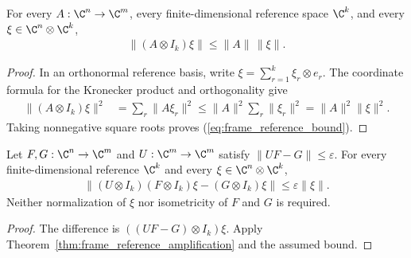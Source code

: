 \begin{theorem}
    \label{thm:frame_reference_amplification}
    \leanok
    For every $A:\C^n\to\C^m$, every finite-dimensional reference space
    $\C^k$, and every $\xi\in\C^n\otimes\C^k$,
    \begin{align}
        \|(A\otimes I_k)\xi\|\le\|A\|\,\|\xi\|.
        \label{eq:frame_reference_bound}
    \end{align}
\end{theorem}
\begin{proof}\leanok
    In an orthonormal reference basis, write
    $\xi=\sum_{r=1}^k\xi_r\otimes e_r$. The coordinate formula for the
    Kronecker product and orthogonality give
    \begin{align}
        \|(A\otimes I_k)\xi\|^2
         & =\sum_r\|A\xi_r\|^2
        \le\|A\|^2\sum_r\|\xi_r\|^2
        =\|A\|^2\|\xi\|^2.
        \label{eq:frame_reference_slices}
    \end{align}
    Taking nonnegative square roots proves (\ref{eq:frame_reference_bound}).
\end{proof}

\begin{theorem}
    \label{thm:frame_encoder_reference}
    \leanok
    Let $F,G:\C^n\to\C^m$ and $U:\C^m\to\C^m$ satisfy
    $\|UF-G\|\le\varepsilon$. For every finite-dimensional reference
    $\C^k$ and every $\xi\in\C^n\otimes\C^k$,
    \begin{align}
        \|(U\otimes I_k)(F\otimes I_k)\xi-(G\otimes I_k)\xi\|
        \le\varepsilon\|\xi\|.
        \label{eq:frame_encoder_reference}
    \end{align}
    Neither normalization of $\xi$ nor isometricity of $F$ and $G$ is required.
\end{theorem}
\begin{proof}\leanok
    The difference is $((UF-G)\otimes I_k)\xi$. Apply
    Theorem~\ref{thm:frame_reference_amplification} and the assumed bound.
\end{proof}
